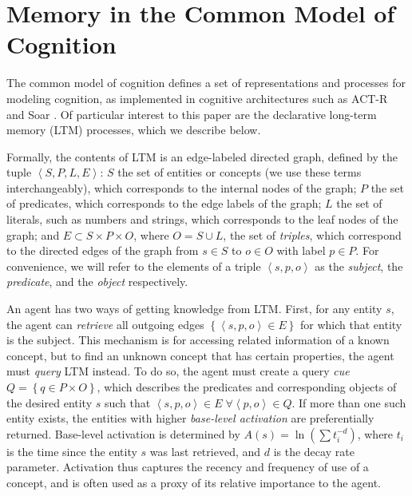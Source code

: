 \documentclass[10pt,letterpaper]{article}
\newcommand{\fixme}[2][]{#2}
\renewcommand{\fixme}[2][]{\textcolor{red}{#2}}
\newcommand{\setof}[1]{\left \{ #1 \right \}}
\newcommand{\tuple}[1]{\left \langle #1 \right \rangle }
\begin{document}

\section{Memory in the Common Model of Cognition}

The common model of cognition \cite{Laird2017AStandardModel} defines a set of representations and processes for modeling cognition, as implemented in cognitive architectures such as ACT-R and Soar \cite{Anderson2007HowCanThe,Laird2012TheSoarCognitive}.
Of particular interest to this paper are the declarative long-term memory (LTM) processes, which we describe below.

Formally, the contents of LTM is an edge-labeled directed graph, defined by the tuple $\tuple{S, P, L, E}$:
$S$ the set of entities or concepts (we use these terms interchangeably), which corresponds to the internal nodes of the graph;
$P$ the set of predicates, which corresponds to the edge labels of the graph;
$L$ the set of literals, such as numbers and strings, which corresponds to the leaf nodes of the graph;
and $E{\subset}S{\times}P{\times}O$, where $O=S{\cup}L$, the set of \emph{triples}, which correspond to the directed edges of the graph from $s{\in}S$ to $o{\in}O$ with label $p{\in}P$.
For convenience, we will refer to the elements of a triple $\tuple{s, p, o}$ as the \emph{subject}, the \emph{predicate}, and the \emph{object} respectively.

An agent has two ways of getting knowledge from LTM.
First, for any entity $s$, the agent can \emph{retrieve} all outgoing edges $\setof{\tuple{s, p, o}{\in}E}$ for which that entity is the subject.
This mechanism is for accessing related information of a known concept, but to find an unknown concept that has certain properties, the agent must \emph{query} LTM instead.
To do so, the agent must create a query \emph{cue} $Q = \setof{q{\in}P{\times}O}$, which describes the predicates and corresponding objects of the desired entity $s$ such that $\tuple{s, p, o}{\in}E \; \forall \tuple{p, o}{\in}Q$.
If more than one such entity exists, the entities with higher \emph{base-level activation} are preferentially returned.
Base-level activation is determined by $A(s) = \ln (\sum {t_i^{-d}})$, where $t_i$ is the time since the entity $s$ was last retrieved, and $d$ is the decay rate parameter.
Activation thus captures the recency and frequency of use of a concept, and is often used as a proxy of its relative importance to the agent.
\fixme[Talk about query vs. retrievals here]{}
\end{document}
